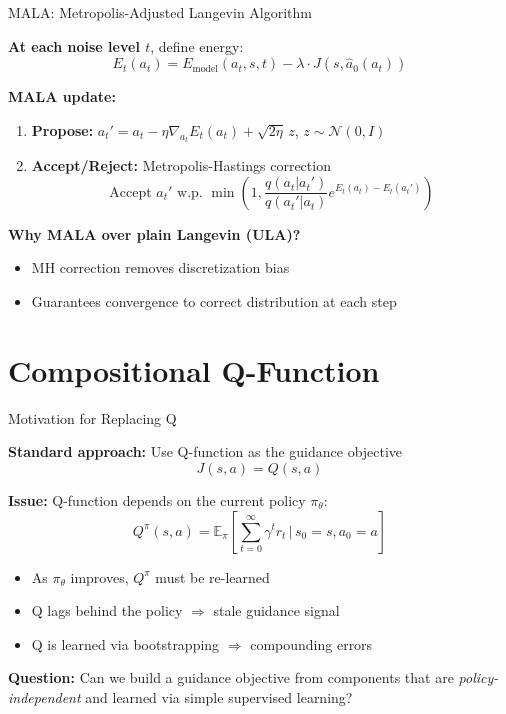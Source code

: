 \documentclass[aspectratio=169]{beamer}
\begin{document}
\begin{frame}{MALA: Metropolis-Adjusted Langevin Algorithm}

\textbf{At each noise level $t$}, define energy:
\[
E_t(a_t) = E_{\text{model}}(a_t, s, t) - \lambda \cdot J(s, \hat{a}_0(a_t))
\]

\textbf{MALA update:}
\begin{enumerate}
    \item \textbf{Propose:} $a_t' = a_t - \eta \nabla_{a_t} E_t(a_t) + \sqrt{2\eta}\, z$, \quad $z \sim \mathcal{N}(0, I)$
    \item \textbf{Accept/Reject:} Metropolis-Hastings correction
    \[
    \text{Accept } a_t' \text{ w.p. } \min\left(1, \frac{q(a_t | a_t')}{q(a_t' | a_t)} e^{E_t(a_t) - E_t(a_t')}\right)
    \]
\end{enumerate}

\vspace{0.5em}
\textbf{Why MALA over plain Langevin (ULA)?}
\begin{itemize}
    \item MH correction removes discretization bias
    \item Guarantees convergence to correct distribution at each step
\end{itemize}

\end{frame}

\section{Compositional Q-Function}

\begin{frame}{Motivation for Replacing Q}

\textbf{Standard approach:} Use Q-function as the guidance objective
\[
J(s, a) = Q(s, a)
\]

\textbf{Issue:} Q-function depends on the current policy $\pi_\theta$:
\[
Q^\pi(s, a) = \mathbb{E}_\pi\left[\sum_{t=0}^\infty \gamma^t r_t \,\Big|\, s_0 = s, a_0 = a\right]
\]

\begin{itemize}
    \item As $\pi_\theta$ improves, $Q^\pi$ must be re-learned
    \item Q lags behind the policy $\Rightarrow$ stale guidance signal
    \item Q is learned via bootstrapping $\Rightarrow$ compounding errors
\end{itemize}

\vspace{0.5em}
\textbf{Question:} Can we build a guidance objective from components that are \emph{policy-independent} and learned via simple supervised learning?

\end{frame}
\end{document}
